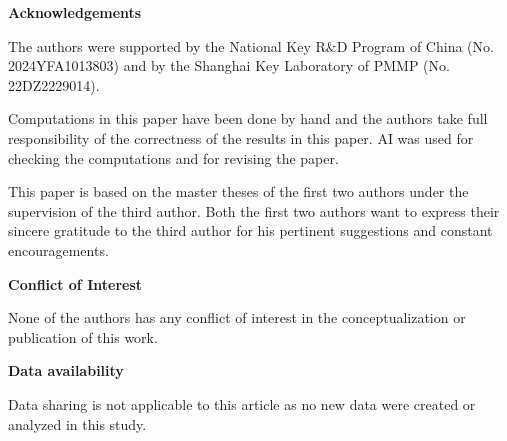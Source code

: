\documentclass[10pt, reqno]{amsart}
\theoremstyle{definition}
\theoremstyle{remark}
\numberwithin{equation}{section}
\begin{document}
\bigskip

\textbf{Acknowledgements}  

The authors were supported by the National Key R$\&$D Program of China (No. 2024YFA1013803) and by the Shanghai Key Laboratory of PMMP (No. 22DZ2229014).

Computations in this paper have been done by hand and the authors take full responsibility of the correctness of the results in this paper.
 AI was used for checking the computations and for revising the paper. 

 This paper is based on the master theses \cite{Shi26}\cite{Long27} of the first two authors under the supervision of the third author. Both the first two authors want to express their sincere gratitude to the third author for his pertinent suggestions and constant encouragements.  


\textbf{Conflict of Interest}


None of the authors has any conflict of interest in the conceptualization or publication of this
work.


\textbf{Data availability}

Data sharing is not applicable to this article as no new data were created or analyzed in this study.

\bigskip
\end{document}

